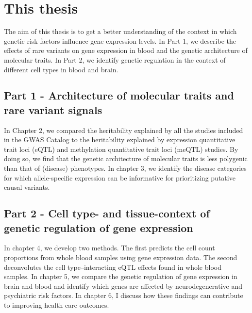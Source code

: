 \section{This thesis}

The aim of this thesis is to get a better understanding of the context in which genetic risk factors influence gene expression levels. In Part 1, we describe the effects of rare variants on gene expression in blood and the genetic architecture of molecular traits. In Part 2, we identify genetic regulation in the context of different cell types in blood and brain.


\subsection{Part 1 - Architecture of molecular traits and rare variant signals}

In Chapter 2, we compared the heritability explained by all the studies included in the GWAS Catalog\cite{bunielloNHGRIEBIGWASCatalog2019} to the heritability explained by expression quantitative trait loci (eQTL) and methylation quantitative trait loci (meQTL) studies. By doing so, we find that the genetic architecture of molecular traits is less polygenic than that of (disease) phenotypes. In chapter 3, we identify the disease categories for which allele-specific expression can be informative for prioritizing putative causal variants.


\subsection{Part 2 - Cell type- and tissue-context of genetic regulation of gene expression}

In chapter 4, we develop two methods. The first predicts the cell count proportions from whole blood samples using gene expression data. The second deconvolutes the cell type‒interacting eQTL effects found in whole blood samples. In chapter 5, we compare the genetic regulation of gene expression in brain and blood and identify which genes are affected by neurodegenerative and psychiatric risk factors. In chapter 6, I discuss how these findings can contribute to improving health care outcomes.












